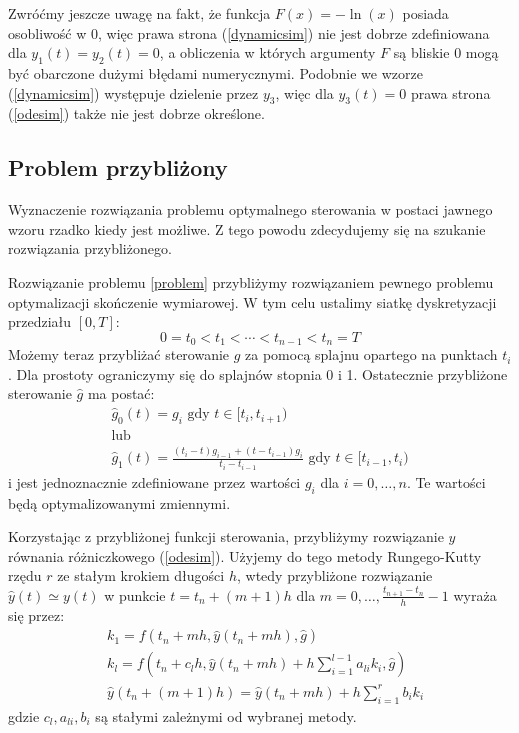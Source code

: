 \documentclass[11pt]{article}
\begin{document}
Zwróćmy jeszcze uwagę na fakt, że funkcja $F(x) = -\ln(x)$ posiada osobliwość w 0, więc prawa strona (\ref{dynamicsim}) nie jest dobrze zdefiniowana dla $y_1(t) = y_2(t) = 0$, a obliczenia w których argumenty $F$ są bliskie 0 mogą być obarczone dużymi błędami numerycznymi. Podobnie we wzorze (\ref{dynamicsim}) występuje dzielenie przez $y_3$, więc dla $y_3(t) = 0$ prawa strona (\ref{odesim}) także nie jest dobrze określone.

\subsection{Problem przybliżony}
Wyznaczenie rozwiązania problemu optymalnego sterowania w postaci jawnego wzoru rzadko kiedy jest możliwe. Z tego powodu zdecydujemy się na szukanie rozwiązania przybliżonego.

Rozwiązanie problemu \ref{problem} przybliżymy rozwiązaniem pewnego problemu optymalizacji skończenie wymiarowej. W tym celu ustalimy siatkę dyskretyzacji przedziału $[0, T]$:
\begin{equation}
  0 = t_0 < t_1 < \cdots < t_{n-1} < t_n = T
\end{equation}
Możemy teraz przybliżać sterowanie $g$ za pomocą splajnu opartego na punktach $t_{i}$. Dla prostoty ograniczymy się do splajnów stopnia 0 i 1. Ostatecznie przybliżone sterowanie $\hat{g}$ ma postać:
\begin{gather}  
    \hat{g}_0(t) = g_i \text{ gdy } t \in [t_{i}, t_{i + 1}) \label{control_1}\\
    \nonumber \text{lub} \\
    \hat{g}_1(t) = \frac{(t_i - t)g_{i-1} + (t - t_{i-1})g_{i}}{t_i - t_{i-1}} \text{ gdy } t \in [t_{i-1}, t_i) \label{control_2}
\end{gather}
i jest jednoznacznie zdefiniowane przez wartości $g_i$ dla $i = 0,\ldots, n$. Te wartości będą optymalizowanymi zmiennymi.

Korzystając z przybliżonej funkcji sterowania, przybliżymy rozwiązanie $y$ równania różniczkowego (\ref{odesim}). Użyjemy do tego metody Rungego-Kutty rzędu $r$ ze stałym krokiem długości $h$, wtedy przybliżone rozwiązanie $\hat{y}(t) \simeq y(t)$ w punkcie $t = t_n + (m + 1)h$ dla $m = 0,\ldots, \frac{t_{n+1}-t_n}{h} - 1$  wyraża się przez:
\begin{equation} \label{rk}
  \begin{split}
    &k_1 = f(t_n + mh, \hat{y}(t_n + mh), \hat{g}) \\
    &k_l = f(t_n + c_l h, \hat{y}(t_n + mh) + h \sum_{i = 1}^{l-1} a_{li}k_i, \hat{g}) \\
    &\hat{y}(t_n + (m+1)h) = \hat{y}(t_n + mh) + h \sum_{i = 1}^r b_i k_i
  \end{split}
\end{equation}
gdzie $c_l, a_{li}, b_i$ są stałymi zależnymi od wybranej metody.
\end{document}
